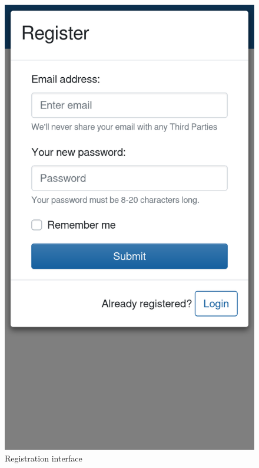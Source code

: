 \begin{figure}[H]
    \centering
    \includegraphics[scale=0.25]{Images/registration_mockup.png}
    \caption{Registration interface}
\end{figure}


